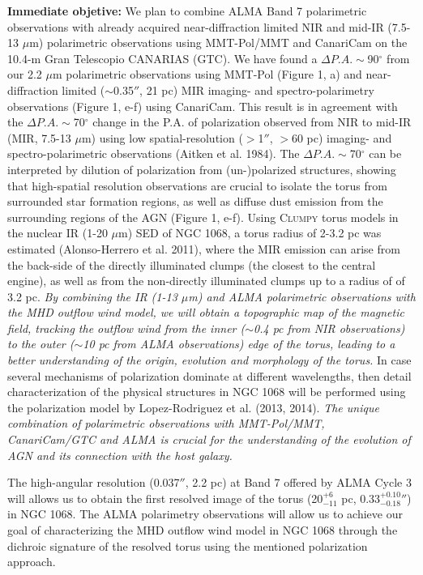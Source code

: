 \documentclass[12pt,a4paper]{article}  %
\begin{document}
\textbf{Immediate objetive:} We plan to combine ALMA Band 7 polarimetric observations with already acquired near-diffraction limited NIR and mid-IR (7.5-13 $\mu$m) polarimetric observations using MMT-Pol/MMT and CanariCam on the 10.4-m Gran Telescopio CANARIAS (GTC). We have found a $\Delta P.A.\sim$90$^{\circ}$ from our 2.2 $\mu$m polarimetric observations using MMT-Pol (Figure 1, a) and near-diffraction limited ($\sim$0.35$''$, 21 pc) MIR imaging- and spectro-polarimetry observations (Figure 1, e-f) using CanariCam. This result is in agreement with the $\Delta P.A.\sim$70$^{\circ}$ change in the P.A. of polarization observed from NIR to mid-IR (MIR, 7.5-13 $\mu$m) using low spatial-resolution ($>$1$''$, $>$60 pc) imaging- and spectro-polarimetric observations (Aitken et al. 1984). The $\Delta P.A.\sim$70$^{\circ}$ can be interpreted by dilution of polarization from (un-)polarized structures, showing that high-spatial resolution observations are crucial to isolate the torus from surrounded star formation regions, as well as diffuse dust emission from the surrounding regions of the AGN (Figure 1, e-f). Using \textsc{Clumpy} torus models in the nuclear IR (1-20 $\mu$m) SED of NGC 1068, a torus radius of 2-3.2 pc was estimated (Alonso-Herrero et al. 2011), where the MIR emission can arise from the back-side of the directly illuminated clumps (the closest to the central engine), as well as from the non-directly illuminated clumps up to a radius of of 3.2 pc. \textit{By combining the IR (1-13 $\mu$m) and ALMA polarimetric observations with the MHD outflow wind model, we will obtain a topographic map of the magnetic field, tracking the outflow wind from the inner ($\sim$0.4 pc from NIR observations) to the outer ($\sim$10 pc from ALMA observations) edge of the torus, leading to a better understanding of the origin, evolution and morphology of the torus.} In case several mechanisms of polarization dominate at different wavelengths, then detail characterization of the physical structures in NGC 1068 will be performed using the polarization model by Lopez-Rodriguez et al. (2013, 2014). \textit{The unique combination of polarimetric observations with MMT-Pol/MMT, CanariCam/GTC and ALMA is crucial for the understanding of the evolution of AGN and its connection with the host galaxy.}

The high-angular resolution (0.037$''$, 2.2 pc) at Band 7 offered by ALMA Cycle 3 will allows us to obtain the first resolved image of the torus (20$^{+6}_{-11}$ pc, 0.33$^{+0.10}_{-0.18}$$''$) in NGC 1068. The ALMA polarimetry observations will allow us to achieve our goal of characterizing the MHD outflow wind model in NGC 1068 through the dichroic signature of the resolved torus using the mentioned polarization approach.
\end{document}
